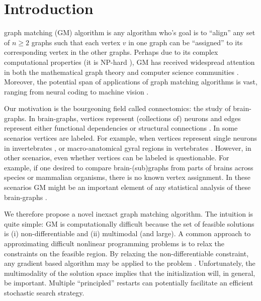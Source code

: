 \documentclass[10pt,journal,cspaper,compsoc]{IEEEtran}
\begin{document}
\maketitle
\IEEEdisplaynotcompsoctitleabstractindextext
\IEEEpeerreviewmaketitle



\section{Introduction}


 graph matching (GM) algorithm is any algorithm who's goal is to ``align'' any set of $n\geq 2$ graphs such that each vertex $v$ in one graph can be ``assigned'' to its corresponding vertex in the other graphs.  Perhaps due to its complex computational properties (it is NP-hard \cite{Garey1979}), GM has received widespread attention in both the mathematical graph theory and computer science communities \cite{Conte2004}.  Moreover, the potential span of applications of graph matching algorithms is vast, ranging from neural coding \cite{Richiardi2010} to machine vision \cite{Wiskott1997}.  

Our motivation is the bourgeoning field called connectomics: the study of brain-graphs.  In brain-graphs,  vertices represent (collections of) neurons and edges represent either functional dependencies or structural connections \cite{Sporns2010}.  In some scenarios vertices are labeled.  For example, when vertices represent single neurons in invertebrates \cite{WhiteBrenner86}, or macro-anatomical gyral regions in vertebrates \cite{Biswal2010,Bullmore2010}.  However, in other scenarios, even whether vertices can be labeled is questionable.  For example, if one desired to compare brain-(sub)graphs from parts of brains across species or mammalian organisms, there is no known vertex assignment.  In these scenarios GM might be an important element of any statistical analysis of these brain-graphs \cite{VP11_sigsub}.


We therefore propose a novel inexact graph matching algorithm.  The intuition is quite simple: GM is computationally difficult because the set of feasible solutions is  (i) non-differentiable  and (ii) multimodal  (and large).   A common approach to approximating difficult nonlinear programming problems is to relax the constraints on the feasible region.  By relaxing the non-differentiable constraint, any gradient based algorithm may be applied to the problem \cite{Mangasarian1987}. Unfortunately, the multimodality of the solution space implies that the initialization will, in general, be important.  Multiple ``principled'' restarts can potentially facilitate an efficient stochastic search strategy.  
\end{document}
